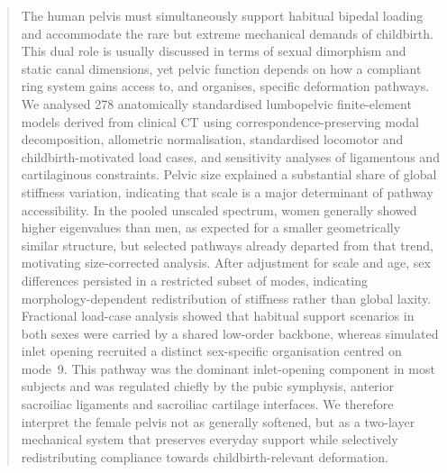 \documentclass[openacc]{rsproca_new}
\begin{document}
\begin{abstract}
The human pelvis must simultaneously support habitual bipedal loading and accommodate the rare but extreme mechanical demands of childbirth. This dual role is usually discussed in terms of sexual dimorphism and static canal dimensions, yet pelvic function depends on how a compliant ring system gains access to, and organises, specific deformation pathways. We analysed 278 anatomically standardised lumbopelvic finite-element models derived from clinical CT using correspondence-preserving modal decomposition, allometric normalisation, standardised locomotor and childbirth-motivated load cases, and sensitivity analyses of ligamentous and cartilaginous constraints. Pelvic size explained a substantial share of global stiffness variation, indicating that scale is a major determinant of pathway accessibility. In the pooled unscaled spectrum, women generally showed higher eigenvalues than men, as expected for a smaller geometrically similar structure, but selected pathways already departed from that trend, motivating size-corrected analysis. After adjustment for scale and age, sex differences persisted in a restricted subset of modes, indicating morphology-dependent redistribution of stiffness rather than global laxity. Fractional load-case analysis showed that habitual support scenarios in both sexes were carried by a shared low-order backbone, whereas simulated inlet opening recruited a distinct sex-specific organisation centred on mode~9. This pathway was the dominant inlet-opening component in most subjects and was regulated chiefly by the pubic symphysis, anterior sacroiliac ligaments and sacroiliac cartilage interfaces. We therefore interpret the female pelvis not as generally softened, but as a two-layer mechanical system that preserves everyday support while selectively redistributing compliance towards childbirth-relevant deformation.
\end{abstract}

\maketitle
\end{document}
